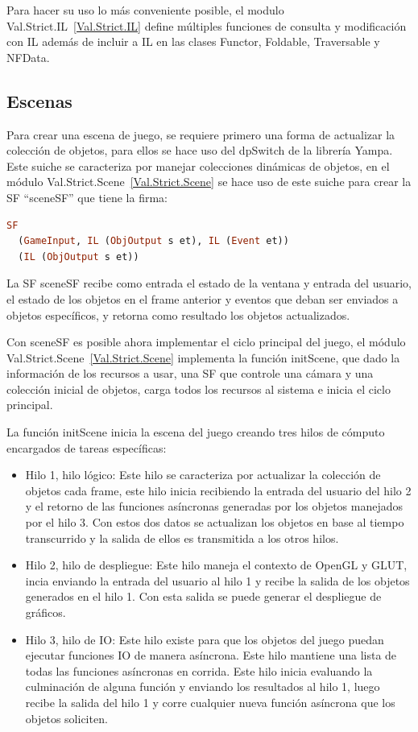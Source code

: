 Para hacer su uso lo más conveniente posible, el modulo Val.Strict.IL~\ref{Val.Strict.IL} define múltiples funciones de consulta y modificación con IL además de incluir a IL en las clases Functor, Foldable, Traversable y NFData.

\subsection{Escenas}
\label{sec:Escenas}

Para crear una escena de juego, se requiere primero una forma de actualizar la colección de objetos, para ellos se hace uso del dpSwitch de la librería Yampa. Este suiche se caracteriza por manejar colecciones dinámicas de objetos, en el módulo Val.Strict.Scene~\ref{Val.Strict.Scene} se hace uso de este suiche para crear la SF “sceneSF” que tiene la firma:

\begin{lstlisting}[frame=single,language=Haskell]
SF
  (GameInput, IL (ObjOutput s et), IL (Event et))
  (IL (ObjOutput s et))
\end{lstlisting}

La SF sceneSF recibe como entrada el estado de la ventana y entrada del usuario, el estado de los objetos en el frame anterior y eventos que deban ser enviados a objetos específicos, y retorna como resultado los objetos actualizados.

Con sceneSF es posible ahora implementar el ciclo principal del juego, el módulo Val.Strict.Scene~\ref{Val.Strict.Scene} implementa la función initScene, que dado la información de los recursos a usar, una SF que controle una cámara y una colección inicial de objetos, carga todos los recursos al sistema e inicia el ciclo principal.

La función initScene inicia la escena del juego creando tres hilos de cómputo encargados de tareas específicas:

\begin{itemize}
\item Hilo 1, hilo lógico: Este hilo se caracteriza por actualizar la colección de objetos cada frame, este hilo inicia recibiendo la entrada del usuario del hilo 2 y el retorno de las funciones asíncronas generadas por los objetos manejados por el hilo 3. Con estos dos datos se actualizan los objetos en base al tiempo transcurrido y la salida de ellos es transmitida a los otros hilos.
\item Hilo 2, hilo de despliegue: Este hilo maneja el contexto de OpenGL y GLUT, incia enviando la entrada del usuario al hilo 1 y recibe la salida de los objetos generados en el hilo 1. Con esta salida se puede generar el despliegue de gráficos.
\item Hilo 3, hilo de IO: Este hilo existe para que los objetos del juego puedan ejecutar funciones IO de manera asíncrona. Este hilo mantiene una lista de todas las funciones asíncronas en corrida. Este hilo inicia evaluando la culminación de alguna función y enviando los resultados al hilo 1, luego recibe la salida del hilo 1 y corre cualquier nueva función asíncrona que los objetos soliciten.
\end{itemize}

